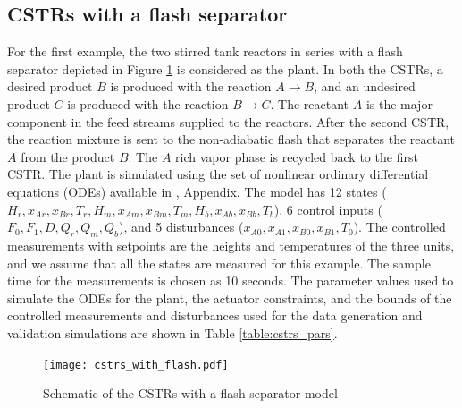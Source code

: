 \documentclass[preprint,5p, twocolumn, authoryear]{elsarticle}
\begin{document}
\subsection{CSTRs with a flash separator}
For the first example, the two 
stirred tank reactors in series with a flash separator
depicted in Figure \ref{fig:schematic_cstrs} 
is considered as the plant.
In both the CSTRs, a desired product $B$ is produced 
with the reaction $A \rightarrow B$, and an undesired 
product $C$ is produced with the reaction $B \rightarrow C$. 
The reactant $A$ is the major component in the 
feed streams supplied to the 
reactors. After the second CSTR, the reaction mixture is 
sent to the non-adiabatic flash that separates the reactant $A$
from the product $B$. The $A$ rich vapor phase 
is recycled back to the first CSTR. 
The plant is simulated using the set of 
nonlinear ordinary differential equations (ODEs) available in 
\cite*{venkat:2006}, Appendix.
The model has 12 states 
($H_r, x_{Ar}, x_{Br}, T_r, 
H_m, x_{Am}, x_{Bm}, T_m, H_b, x_{Ab}, x_{Bb}, T_b$),
6 control inputs 
($F_0, F_1, D, Q_r, Q_m, Q_b$), and 5 disturbances
($x_{A0}, x_{A1}, x_{B0}, x_{B1}, T_0$).
The controlled measurements with setpoints are the heights
and temperatures of the three units, and we
assume that all the states are measured for this example. 
The sample time for the measurements is chosen as 10 seconds. 
The parameter values used to simulate the ODEs for the plant, 
the actuator constraints, and the bounds of the controlled 
measurements and disturbances used for the data generation 
and validation simulations are 
shown in Table \ref{table:cstrs_pars}.

\begin{figure}[h]
    \centering
    \texttt{[image: cstrs\_with\_flash.pdf]}
    \caption{Schematic of the CSTRs with a flash separator model}
    \label{fig:schematic_cstrs}
\end{figure}
\end{document}
